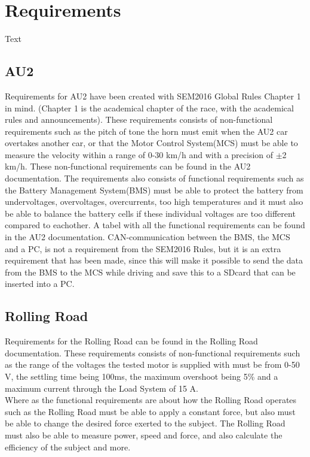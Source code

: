 \chapter{Requirements}
Text

\section{AU2}
Requirements for AU2 have been created with SEM2016 Global Rules Chapter 1 in mind. (Chapter 1 is the academical chapter of the race, with the academical rules and announcements). These requirements consists of non-functional requirements such as the pitch of tone the horn must emit when the AU2 car overtakes another car, or that the Motor Control System(MCS) must be able to measure the velocity within a range of 0-30 km/h and with a precision of $\pm$2 km/h. These non-functional requirements can be found in the AU2 documentation. The requirements also consists of functional requirements such as the Battery Management System(BMS) must be able to protect the battery from undervoltages, overvoltages, overcurrents, too high temperatures and it must also be able to balance the battery cells if these individual voltages are too different compared to eachother. A tabel with all the functional requirements can be found in the AU2 documentation. CAN-communication between the BMS, the MCS and a PC, is not a requirement from the SEM2016 Rules, but it is an extra requirement that has been made, since this will make it possible to send the data from the BMS to the MCS while driving and save this to a SDcard that can be inserted into a PC.

\section{Rolling Road}
Requirements for the Rolling Road can be found in the Rolling Road documentation.
These requirements consists of non-functional requirements such as the range of the voltages the tested motor is supplied with must be from 0-50 V, the settling time being 100ms, the maximum overshoot being 5\% and a maximum current through the Load System of 15 A.\\
Where as the functional requirements are about how the Rolling Road operates such as the Rolling Road must be able to apply a constant force, but also must be able to change the desired force exerted to the subject. The Rolling Road must also be able to measure power, speed and force, and also calculate the efficiency of the subject and more.

